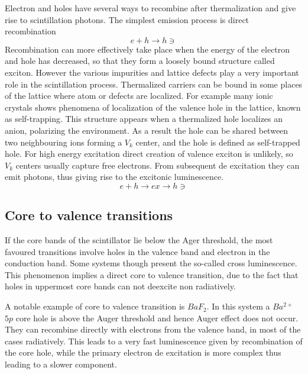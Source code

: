 Electron and holes have several ways to recombine after thermalization and give rise to scintillation photons.
The simplest emission process is direct recombination
\begin{equation}
e + h \rightarrow h\ni
\end{equation}
Recombination can more effectively take place when the energy of the electron and hole has decreased, so that they form a loosely bound structure called exciton. 
However the various impurities and lattice defects play a very important role in the scintillation process. Thermalized carriers can be bound in some places of the lattice where atom or defects are localized. 
For example many ionic crystals shows phenomena of localization of the valence hole in the lattice, known as self-trapping. This structure appears when a thermalized hole localizes an anion, polarizing the environment. As a result the hole can be shared between two neighbouring ions forming a $V_{k}$ center, and the hole is defined as self-trapped hole. For high energy excitation direct creation of valence exciton is unlikely, so $V_{k}$ centers usually capture free electrons. From subsequent de excitation they can emit photons, thus giving rise to the excitonic luminescence.
\begin{equation} 
e + h \rightarrow ex \rightarrow h\ni
\end{equation}
\subsection{Core to valence transitions}

If the core bands of the scintillator lie below the Ager threshold, the most favoured transitions involve holes in the valence band and electron in the conduction band. Some systems though present the so-called cross luminescence. This phenomenon implies a direct core to valence transition, due to the fact that holes in uppermost core bands can not deexcite non radiatively\cite{Lecoq2006}. 

A notable example of core to valence transition is $BaF_{2}$. In this system a $Ba^{2+}$ $5p$ core hole is above the Auger threshold and hence Auger effect does not occur. They can recombine directly with electrons from the valence band, in most of the cases radiatively.
This leads to a very fast luminescence given by recombination of the core hole, while the primary electron de excitation is more complex thus leading to a slower component.


